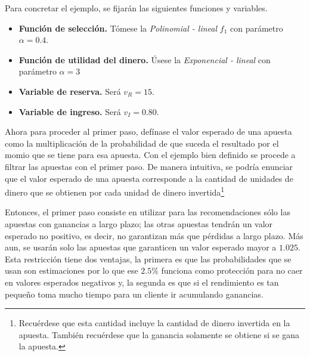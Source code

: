 Para concretar el ejemplo, se fijarán las siguientes funciones y variables.
\begin{itemize}
	\item \textbf{Función de selección.} Tómese la \emph{Polinomial - lineal} $f_1$ con parámetro $\alpha = 0.4$.
	\item \textbf{Función de utilidad del dinero.} Úsese la \emph{Exponencial - lineal} con parámetro $\alpha = 3$
	\item \textbf{Variable de reserva.} Será $v_R = 15$.
	\item \textbf{Variable de ingreso.} Será $v_I = 0.80$.
\end{itemize}
	

Ahora para proceder al primer paso, defínase el valor esperado de una apuesta como la multiplicación de la probabilidad de que suceda el resultado por el momio que se tiene para esa apuesta. 
Con el ejemplo bien definido se procede a filtrar las apuestas con el primer paso. De manera intuitiva, se podría enunciar que el valor esperado de una apuesta corresponde a la cantidad de unidades de dinero que se obtienen por cada unidad de dinero invertida\footnote{Recuérdese que esta cantidad incluye la cantidad de dinero invertida en la apuesta. También recuérdese que la ganancia solamente se obtiene si se gana la apuesta.}

Entonces, el primer paso consiste en utilizar para las recomendaciones sólo las apuestas con ganancias a largo plazo; las otras apuestas tendrán un valor esperado no positivo, es decir, no garantizan más que pérdidas a largo plazo. Más aun, se usarán solo las apuestas que garanticen un valor esperado mayor a $1.025$. Esta restricción tiene dos ventajas, la primera es que las probabilidades que se usan son estimaciones por lo que ese $2.5\%$ funciona como protección para no caer en valores esperados negativos y, la segunda es que si el rendimiento es tan pequeño toma mucho tiempo para un cliente ir acumulando ganancias. 

